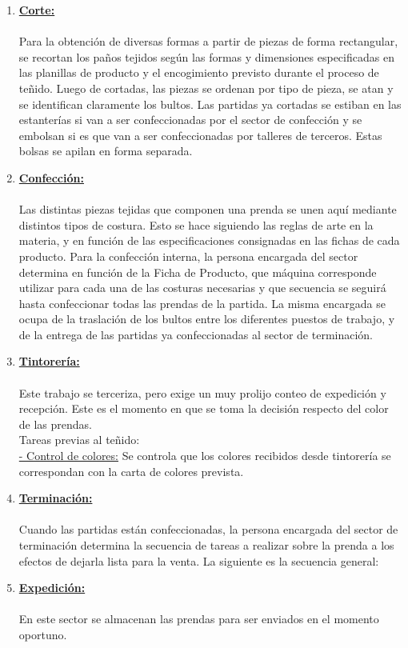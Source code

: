\documentclass[a4paper,10pt,titlepage]{article}
\begin{document}
\begin{enumerate}
\begin{itemize}
				\end{itemize}
			\item \textbf{\underline{Corte:}}\\\\
			\indent Para la obtenci\'on de diversas formas a partir de piezas de forma rectangular, se recortan los paños tejidos seg\'un las formas y dimensiones especificadas en las planillas de producto y el encogimiento previsto durante el proceso de teñido. Luego de cortadas, las piezas se ordenan por tipo de pieza, se atan y se identifican claramente los bultos. Las partidas ya cortadas se estiban en las estanter\'ias si van a ser confeccionadas por el sector de confecci\'on y se embolsan si es que van a ser confeccionadas por talleres de terceros. Estas bolsas se apilan en forma separada.\\
			\item \textbf{\underline{Confecci\'on:}}\\\\
			\indent Las distintas piezas tejidas que componen una prenda se unen aqu\'i mediante distintos tipos de costura. Esto se hace siguiendo las reglas de arte en la materia, y en funci\'on de las especificaciones consignadas en las fichas de cada producto. Para la confecci\'on interna, la persona encargada del sector determina en funci\'on de la Ficha de Producto, que m\'aquina corresponde utilizar para cada una de las costuras necesarias y que secuencia se seguir\'a hasta confeccionar todas las prendas de la partida. La misma encargada se ocupa de la traslaci\'on de los bultos entre los diferentes puestos de trabajo, y de la entrega de las partidas ya confeccionadas al sector de terminaci\'on.\\
			\item \textbf{\underline{Tintorer\'ia:}}\\\\
			\indent Este trabajo se terceriza, pero exige un muy prolijo conteo de expedici\'on y recepci\'on. Este es el momento en que se toma la decisi\'on respecto del color de las prendas.\\
			\indent Tareas previas al teñido:\\
			\indent \underline{ - Control de colores:} Se controla que los colores recibidos desde tintorer\'ia se correspondan con la carta de colores prevista.\\
			\item \textbf{\underline{Terminaci\'on:}}\\\\
			\indent Cuando las partidas est\'an confeccionadas, la persona encargada del sector de terminaci\'on determina la secuencia de tareas a realizar sobre la prenda a los efectos de dejarla lista para la venta. La siguiente es la secuencia general:\\

			\item \textbf{\underline{Expedici\'on:}}\\\\
			\indent En este sector se almacenan las prendas para ser enviados en el momento oportuno.\\
			\end{enumerate}
\end{document}
